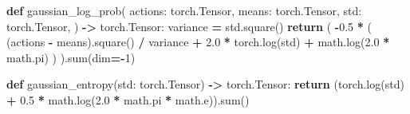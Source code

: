 \documentclass[
  american,
  11pt,
  letterpaper,
]{article}
\newenvironment{Shaded}{\begin{snugshade}}{\end{snugshade}}
\newcommand{\BuiltInTok}[1]{#1}
\newcommand{\ControlFlowTok}[1]{\textcolor[rgb]{0.13,0.29,0.53}{\textbf{#1}}}
\newcommand{\DecValTok}[1]{\textcolor[rgb]{0.00,0.00,0.81}{#1}}
\newcommand{\FloatTok}[1]{\textcolor[rgb]{0.00,0.00,0.81}{#1}}
\newcommand{\KeywordTok}[1]{\textcolor[rgb]{0.13,0.29,0.53}{\textbf{#1}}}
\newcommand{\NormalTok}[1]{#1}
\newcommand{\OperatorTok}[1]{\textcolor[rgb]{0.81,0.36,0.00}{\textbf{#1}}}
\renewenvironment{Shaded}{\par\smallskip}{\par\smallskip}
\begin{document}
\begin{Shaded}
\begin{Highlighting}[]
\KeywordTok{def}\NormalTok{ gaussian\_log\_prob(}
\NormalTok{    actions: torch.Tensor,}
\NormalTok{    means: torch.Tensor,}
\NormalTok{    std: torch.Tensor,}
\NormalTok{) }\OperatorTok{{-}\textgreater{}}\NormalTok{ torch.Tensor:}
\NormalTok{    variance }\OperatorTok{=}\NormalTok{ std.square()}
    \ControlFlowTok{return}\NormalTok{ (}
        \OperatorTok{{-}}\FloatTok{0.5}
        \OperatorTok{*}\NormalTok{ (}
\NormalTok{            (actions }\OperatorTok{{-}}\NormalTok{ means).square() }\OperatorTok{/}\NormalTok{ variance}
            \OperatorTok{+} \FloatTok{2.0} \OperatorTok{*}\NormalTok{ torch.log(std)}
            \OperatorTok{+}\NormalTok{ math.log(}\FloatTok{2.0} \OperatorTok{*}\NormalTok{ math.pi)}
\NormalTok{        )}
\NormalTok{    ).}\BuiltInTok{sum}\NormalTok{(dim}\OperatorTok{={-}}\DecValTok{1}\NormalTok{)}


\KeywordTok{def}\NormalTok{ gaussian\_entropy(std: torch.Tensor) }\OperatorTok{{-}\textgreater{}}\NormalTok{ torch.Tensor:}
    \ControlFlowTok{return}\NormalTok{ (torch.log(std) }\OperatorTok{+} \FloatTok{0.5} \OperatorTok{*}\NormalTok{ math.log(}\FloatTok{2.0} \OperatorTok{*}\NormalTok{ math.pi }\OperatorTok{*}\NormalTok{ math.e)).}\BuiltInTok{sum}\NormalTok{()}



\end{Highlighting}
\end{Shaded}
\end{document}
